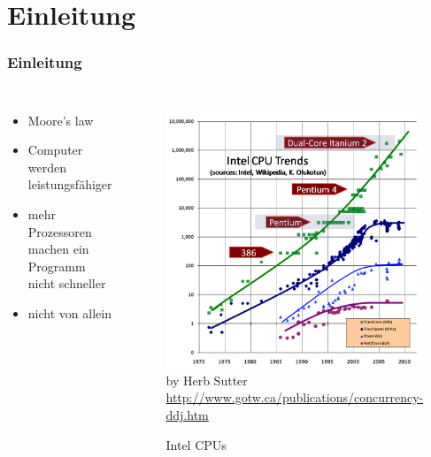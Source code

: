 \section{Einleitung}

\begin{frame}[c]
    \frametitle{Einleitung}
    \begin{columns}
        \begin{itemize}
            \item Moore's law
            \item Computer werden leistungsfähiger
            \item mehr Prozessoren machen ein Programm nicht schneller
            \item nicht von allein
        \end{itemize}
        \begin{figure}
            \centering
            \copyrightbox%
                {\includegraphics[height=0.6\textheight]{images/CPU}}%
                {by Herb Sutter \url{http://www.gotw.ca/publications/concurrency-ddj.htm}}
            \caption{Intel CPUs}
        \end{figure}
    \end{columns}
\end{frame}

